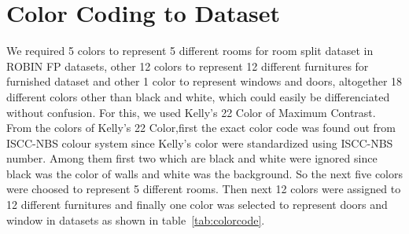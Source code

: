         \section{Color Coding to Dataset}
            We required 5 colors to represent 5 different rooms for room split dataset in ROBIN FP datasets,  other 12 colors to represent 12 different furnitures for furnished dataset and other 1 color to represent windows and doors, altogether 18 different colors other than black and white, which could easily be differenciated without confusion. For this, we used Kelly’s 22 Color of Maximum Contrast.\\
            From the colors of Kelly’s 22 Color,first the exact color code was found out from ISCC-NBS colour system\cite{centore2016srgb} since Kelly's color were standardized using ISCC-NBS number.  Among them first two which are black and white were ignored since black was the color of walls and white was the background. So the next five colors were choosed to represent 5 different rooms. Then next 12 colors were assigned to 12 different furnitures and finally one color was selected to represent doors and window in datasets as shown in table~\ref{tab:colorcode}.\\
